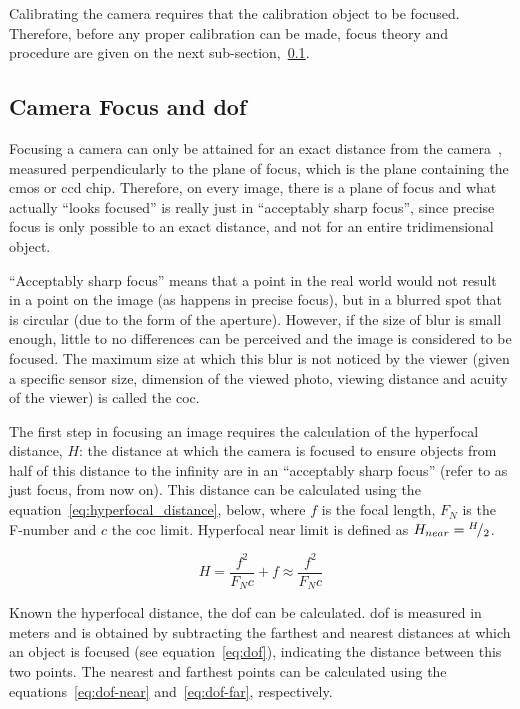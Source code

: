 Calibrating the camera requires that the calibration object to be focused. Therefore, before any proper calibration can be made, focus theory and procedure are given on the next sub-section,~\ref{subsec:calibration:camera-focus}.


\subsection{Camera Focus and \acl{dof}}
\label{subsec:calibration:camera-focus}
Focusing a camera can only be attained for an exact distance from the camera~\cite{Merklinger1993, Photopillers}, measured perpendicularly to the plane of focus, which is the plane containing the \ac{cmos} or \ac{ccd} chip. Therefore, on every image, there is a plane of focus and what actually ``looks focused'' is really just in ``acceptably sharp focus'', since precise focus is only possible to an exact distance, and not for an entire tridimensional object.

``Acceptably sharp focus'' means that a point in the real world would not result in a point on the image (as happens in precise focus), but in a blurred spot that is circular (due to the form of the aperture)\cite{Photopillers}. However, if the size of blur is small enough, little to no differences can be perceived and the image is considered to be focused\cite{Photopillers}. The maximum size at which this blur is not noticed by the viewer (given a specific sensor size, dimension of the viewed photo, viewing distance and acuity of the viewer) is called the \ac{coc}\cite{Photopillers, Merklinger1993}.

The first step in focusing an image requires the calculation of the hyperfocal distance, $H$: the distance at which the camera is focused to ensure objects from half of this distance to the infinity are in an ``acceptably sharp focus'' (refer to as just focus, from now on). This distance can be calculated using the equation~\ref{eq:hyperfocal_distance}, below, where $f$ is the focal length, $F_N$ is the F-number and $c$ the \ac{coc} limit. Hyperfocal near limit is defined as $H_{near} = {}^{H}\!/_{2}$.

\begin{equation}
	\label{eq:hyperfocal_distance}
	H = \frac{f^2}{F_Nc} + f \approx \frac{f^2}{F_Nc} 
\end{equation}

Known the hyperfocal distance, the \acf{dof} can be calculated. \ac{dof} is measured in meters and is obtained by subtracting the farthest and nearest distances at which an object is focused (see equation~\ref{eq:dof}), indicating the distance between this two points\cite{Photopillers, Merklinger1993, mvg_book}. The nearest and farthest points can be calculated using the equations~\ref{eq:dof-near} and~\ref{eq:dof-far}, respectively.

